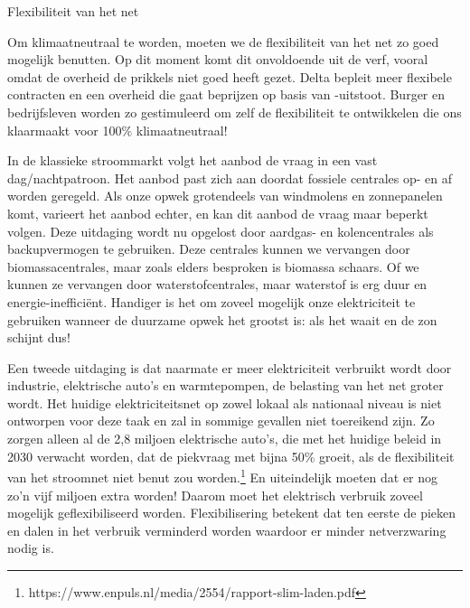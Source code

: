 \begin{voorstel}{Flexibiliteit van het net}

\begin{samenvatting}
Om klimaatneutraal te worden, moeten we de flexibiliteit van het net zo goed mogelijk benutten. Op dit moment komt dit onvoldoende uit de verf, vooral omdat de overheid de prikkels niet goed heeft gezet. Delta bepleit meer flexibele contracten en een overheid die gaat beprijzen op basis van \COO-uitstoot. Burger en bedrijfsleven worden zo gestimuleerd om zelf de flexibiliteit te ontwikkelen die ons klaarmaakt voor 100\% klimaatneutraal!
\end{samenvatting}

\begin{uitdaging}
In de klassieke stroommarkt volgt het aanbod de vraag in een vast dag/nachtpatroon. Het aanbod past zich aan doordat fossiele centrales op- en af worden geregeld. Als onze opwek grotendeels van windmolens en zonnepanelen komt, varieert het aanbod echter, en kan dit aanbod de vraag maar beperkt volgen. Deze uitdaging wordt nu opgelost door aardgas- en kolencentrales als backupvermogen te gebruiken. Deze centrales kunnen we vervangen door biomassacentrales, maar zoals elders besproken is biomassa schaars. Of we kunnen ze vervangen door waterstofcentrales, maar waterstof is erg duur en energie-inefficiënt. Handiger is het om zoveel mogelijk onze elektriciteit te gebruiken wanneer de duurzame opwek het grootst is: als het waait en de zon schijnt dus!

Een tweede uitdaging is dat naarmate er meer elektriciteit verbruikt wordt door industrie, elektrische auto’s en warmtepompen, de belasting van het net groter wordt. Het huidige elektriciteitsnet op zowel lokaal als nationaal niveau is niet ontworpen voor deze taak en zal in sommige gevallen niet toereikend zijn. Zo zorgen alleen al de 2,8 miljoen elektrische auto’s, die met het huidige beleid in 2030 verwacht worden, dat de piekvraag met bijna 50\% groeit, als de flexibiliteit van het stroomnet niet benut zou worden.\footnote{https://www.enpuls.nl/media/2554/rapport-slim-laden.pdf} En uiteindelijk moeten dat er nog zo’n vijf miljoen extra worden! Daarom moet het elektrisch verbruik zoveel mogelijk geflexibiliseerd worden. Flexibilisering betekent dat ten eerste de pieken en dalen in het verbruik verminderd worden waardoor er minder netverzwaring nodig is. 


\end{uitdaging}
\end{voorstel}
